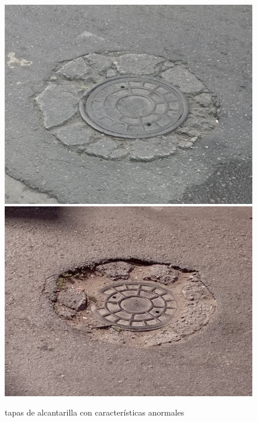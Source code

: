 \begin{appendices}
		\begin{figure}[htb]
			\centering
			\includegraphics[scale = 0.3]{Graphics/pothole_4.jpg}
			\includegraphics[scale = 0.3]{Graphics/pothole_5.jpg}
			\caption{tapas de alcantarilla con características anormales}
			\label{fig:17}
		\end{figure}
		\newpage


\end{appendices}
